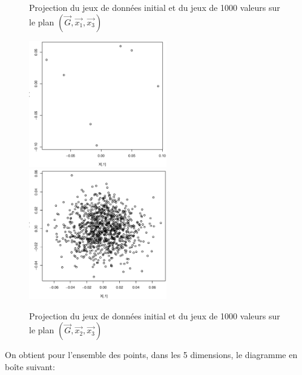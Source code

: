 \documentclass[a4paper]{article}
\begin{document}
\begin{appendices}
\begin{figure}[H]
\caption{Projection du jeux de données initial et du jeux de 1000 valeurs sur le plan $(\vec{G},\vec{x_{1}},\vec{x_{3}})$}
 \label{planprincip2}  
\end{figure}
\begin{figure}[H]
\includegraphics[width=6cm]{projdataex23.eps}\hfill
\includegraphics[width=6cm]{projgenerex23.eps}
\caption{Projection du jeux de données initial et du jeux de 1000 valeurs sur le plan $(\vec{G},\vec{x_{2}},\vec{x_{3}})$}
 \label{planprincip3}  
\end{figure}

On obtient pour l'ensemble des points, dans les 5 dimensions, le diagramme en boîte suivant:


\end{appendices}
\end{document}
